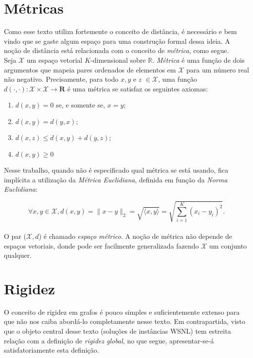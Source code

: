 \section{Métricas}
\label{ap:metric}

Como esse texto utiliza fortemente o conceito de distância, é necessário e bem vindo que se gaste algum espaço para uma construção formal dessa ideia. A noção de distância está relacionada com o conceito de \textit{métrica}, como segue.
\\

Seja $\mathcal{X}$ um espaço vetorial $K$-dimensional sobre $\mathbb{R}$. \textit{Métrica} é uma função de dois argumentos que mapeia pares ordenados de elementos em $\mathcal{X}$ para um número real não negativo. Precisamente, para todo $x, y$ e $z$ $\in \mathcal{X}$, uma função $d(\cdot,\cdot): \mathcal{X} \times \mathcal{X} \longrightarrow \mathbf{R}$ é uma métrica se satisfaz os seguintes axiomas:

\begin{enumerate}
	\item $d(x,y) = 0$ se, e somente se, $x = y$; 
	\item $d(x,y) = d(y,x)$;
	\item $d(x,z) \leq d(x,y) + d(y,z)$;
	\item $d(x,y) \geq 0$
\end{enumerate}

Nesse trabalho, quando não é especificado qual métrica se está usando, fica implícita a utilização da \textit{Métrica Euclidiana}, definida em função da \textit{Norma Euclidiana}:

\begin{equation}\tag{Norma Euclidiana}
\forall x, y \in \mathcal{X}, d(x,y) = \lVert x-y \rVert_2 = \sqrt{\langle x, y\rangle} = \sqrt{\sum_{i = 1}^{K} (x_i-y_i)^2}.
\label{eq:normaEuclidiana}
\end{equation}
\\

O par ($\mathcal{X}, d$) é chamado \textit{espaço métrico}. A noção de métrica não depende de espaços vetoriais, donde pode ser facilmente generalizada fazendo $\mathcal{X}$ um conjunto qualquer.

\section{Rigidez}
\label{ap:rigid}

O conceito de rigidez em grafos é pouco simples e suficientemente extenso para que não nos caiba abordá-lo completamente nesse texto. Em contrapartida, visto que o objeto central desse texto (soluções de instâncias WSNL) tem estreita relação com a definição de \textit{rigidez global}, no que segue, apresentar-se-á satisfatoriamente esta definição. 

